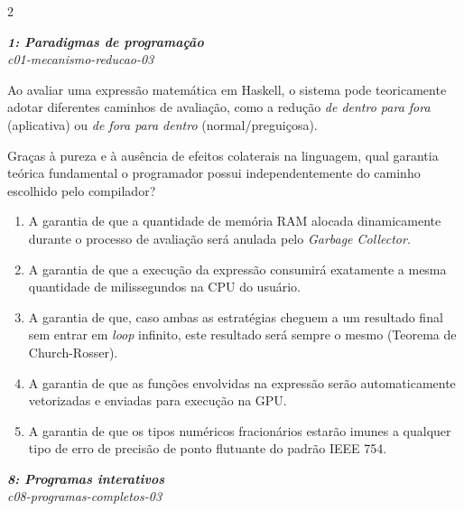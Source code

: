 \documentclass[a4paper,10pt,brazil]{article}
\begin{document}
\begin{multicols}{2}
\begin{enumerate}
\end{enumerate}

\begin{flushright}
  \footnotesize
  \textit{\textbf{1: Paradigmas de programação}}\\
  \textit{c01-mecanismo-reducao-03}\\

\end{flushright}
Ao avaliar uma expressão matemática em Haskell, o sistema pode teoricamente adotar diferentes caminhos de avaliação, como a redução \emph{de dentro para fora} (aplicativa) ou \emph{de fora para dentro} (normal/preguiçosa). 

Graças à pureza e à ausência de efeitos colaterais na linguagem, qual garantia teórica fundamental o programador possui independentemente do caminho escolhido pelo compilador?

\begin{enumerate}
  \item A garantia de que a quantidade de memória RAM alocada dinamicamente durante o processo de avaliação será anulada pelo \emph{Garbage Collector}.

  \item A garantia de que a execução da expressão consumirá exatamente a mesma quantidade de milissegundos na CPU do usuário.

  \item A garantia de que, caso ambas as estratégias cheguem a um resultado final sem entrar em \emph{loop} infinito, este resultado será sempre o mesmo (Teorema de Church-Rosser).

  \item A garantia de que as funções envolvidas na expressão serão automaticamente vetorizadas e enviadas para execução na GPU.

  \item A garantia de que os tipos numéricos fracionários estarão imunes a qualquer tipo de erro de precisão de ponto flutuante do padrão IEEE 754.


\end{enumerate}

\begin{flushright}
  \footnotesize
  \textit{\textbf{8: Programas interativos}}\\
  \textit{c08-programas-completos-03}\\


\end{flushright}
\end{multicols}
\end{document}
